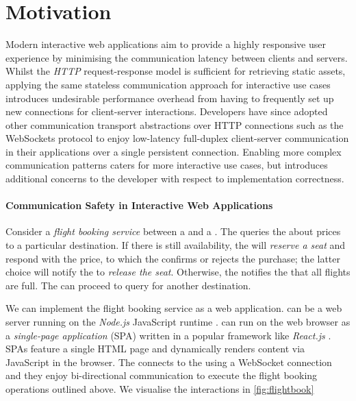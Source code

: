 \section{Motivation}
\label{section:intro}

Modern interactive web applications aim to 
provide a highly responsive user experience by 
minimising the communication latency between clients and servers. 
Whilst the \textit{HTTP} 
request-response model is 
sufficient for retrieving static assets, 
applying the same 
stateless communication approach for 
interactive use cases 
introduces 
undesirable performance overhead from having to 
frequently set up 
new connections for client-server interactions. 
Developers have since adopted other communication 
transport abstractions over HTTP connections such 
as the WebSockets protocol \cite{WebSocketRFC}
to enjoy low-latency full-duplex 
client-server communication in their applications over 
a single persistent connection. 
Enabling more complex communication patterns caters for 
more interactive use cases, but introduces additional 
concerns to the developer with respect to implementation correctness.

\paragraph{Communication Safety 
in Interactive Web Applications}

Consider a \textit{flight booking service}
between a  and a .
The  queries the 
about prices to a particular destination.
If there is still availability, 
the  will \textit{reserve a seat}
and respond with the price,
to which the  confirms or rejects the purchase;
the latter choice will notify the 
to \textit{release the seat}.
Otherwise, the  notifies the
 that all flights are full.
The  can proceed to query for another
destination.

We can implement the flight booking service as a web
application.
 can be a web server
running on the \textit{Node.js} JavaScript runtime \cite{nodejs}.
 can run on the web browser
as a \textit{single-page application} (SPA) written
in a popular framework like \textit{React.js} \cite{React}.
SPAs feature a single HTML page and dynamically renders
content via JavaScript in the browser.
The  connects to the 
using a WebSocket connection and they enjoy
bi-directional communication to execute the flight
booking operations outlined above.
We visualise the interactions in \cref{fig:flightbook}

